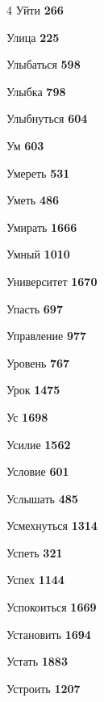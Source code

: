 \begin{multicols}{4}
\noindent Уйти \dotfill \textbf{\color{secondary} 266}\par
\noindent Улица \dotfill \textbf{\color{secondary} 225}\par
\noindent Улыбаться \dotfill \textbf{\color{secondary} 598}\par
\noindent Улыбка \dotfill \textbf{\color{secondary} 798}\par
\noindent Улыбнуться \dotfill \textbf{\color{secondary} 604}\par
\noindent Ум \dotfill \textbf{\color{secondary} 603}\par
\noindent Умереть \dotfill \textbf{\color{secondary} 531}\par
\noindent Уметь \dotfill \textbf{\color{secondary} 486}\par
\noindent Умирать \dotfill \textbf{\color{secondary} 1666}\par
\noindent Умный \dotfill \textbf{\color{secondary} 1010}\par
\noindent Университет \dotfill \textbf{\color{secondary} 1670}\par
\noindent Упасть \dotfill \textbf{\color{secondary} 697}\par
\noindent Управление \dotfill \textbf{\color{secondary} 977}\par
\noindent Уровень \dotfill \textbf{\color{secondary} 767}\par
\noindent Урок \dotfill \textbf{\color{secondary} 1475}\par
\noindent Ус \dotfill \textbf{\color{secondary} 1698}\par
\noindent Усилие \dotfill \textbf{\color{secondary} 1562}\par
\noindent Условие \dotfill \textbf{\color{secondary} 601}\par
\noindent Услышать \dotfill \textbf{\color{secondary} 485}\par
\noindent Усмехнуться \dotfill \textbf{\color{secondary} 1314}\par
\noindent Успеть \dotfill \textbf{\color{secondary} 321}\par
\noindent Успех \dotfill \textbf{\color{secondary} 1144}\par
\noindent Успокоиться \dotfill \textbf{\color{secondary} 1669}\par
\noindent Установить \dotfill \textbf{\color{secondary} 1694}\par
\noindent Устать \dotfill \textbf{\color{secondary} 1883}\par
\noindent Устроить \dotfill \textbf{\color{secondary} 1207}\par

\end{multicols}
